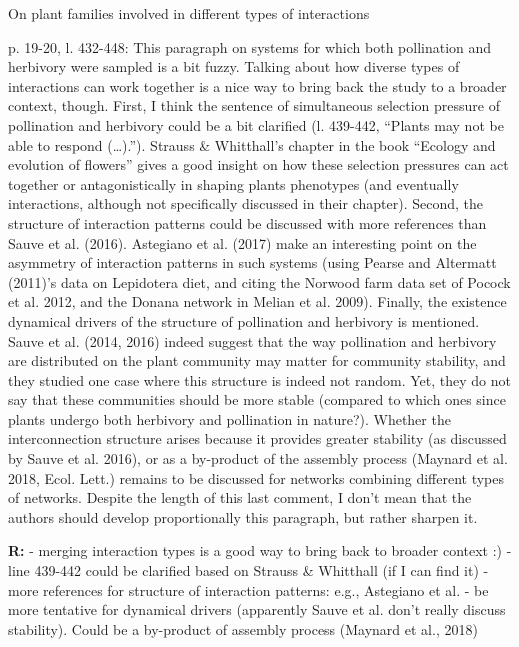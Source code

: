 \documentclass[12pt]{letter}
\newenvironment{refquote}{\bigskip \begin{it}}{\end{it}\smallskip}
\begin{document}
	\begin{refquote}
		On plant families involved in different types of interactions

		p. 19-20, l. 432-448: This paragraph on systems for which both pollination and herbivory were sampled is a bit fuzzy. Talking about how diverse types of interactions can work together is a nice way to bring back the study to a broader context, though.
		First, I think the sentence of simultaneous selection pressure of pollination and herbivory could be a bit clarified (l. 439-442, “Plants may not be able to respond (…).”). Strauss & Whitthall’s chapter in the book “Ecology and evolution of flowers” gives a good insight on how these selection pressures can act together or antagonistically in shaping plants phenotypes (and eventually interactions, although not specifically discussed in their chapter).
		Second, the structure of interaction patterns could be discussed with more references than Sauve et al. (2016). Astegiano et al. (2017) make an interesting point on the asymmetry of interaction patterns in such systems (using Pearse and Altermatt (2011)’s data on Lepidotera diet, and citing the Norwood farm data set of Pocock et al. 2012, and the Donana network in Melian et al. 2009).
		Finally, the existence dynamical drivers of the structure of pollination and herbivory is mentioned. Sauve et al. (2014, 2016) indeed suggest that the way pollination and herbivory are distributed on the plant community may matter for community stability, and they studied one case where this structure is indeed not random. Yet, they do not say that these communities should be more stable (compared to which ones since plants undergo both herbivory and pollination in nature?). Whether the interconnection structure arises because it provides greater stability (as discussed by Sauve et al. 2016), or as a by-product of the assembly process (Maynard et al. 2018, Ecol. Lett.) remains to be discussed for networks combining different types of networks.
		Despite the length of this last comment, I don’t mean that the authors should develop proportionally this paragraph, but rather sharpen it.
	\end{refquote}


	\textbf{R:} - merging interaction types is a good way to bring back to broader context :) - line 439-442 could be clarified based on Strauss & Whitthall (if I can find it) - more references for structure of interaction patterns: e.g., Astegiano et al. - be more tentative for dynamical drivers (apparently Sauve et al. don't really discuss stability). Could be a by-product of assembly process (Maynard et al., 2018)
\end{document}
